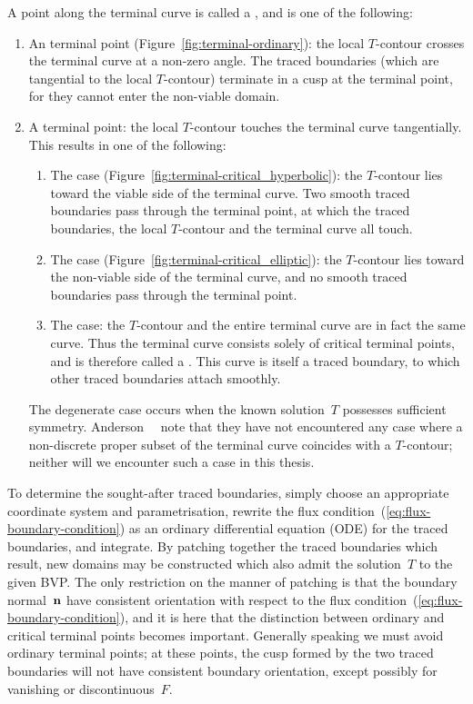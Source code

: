 A point along the terminal curve is called a ,
and is one of the following:
\begin{enumerate}
  \item
    An  terminal point
    (Figure~\ref{fig:terminal-ordinary}):
    the local $T$-contour crosses the terminal curve at a non-zero angle.
    The traced boundaries (which are tangential to the local $T$-contour)
    terminate in a cusp at the terminal point,
    for they cannot enter the non-viable domain.
  \item
    A  terminal point:
    the local $T$-contour touches the terminal curve tangentially.
    This results in one of the following:
    \begin{enumerate}
      \item
        The  case
        (Figure~\ref{fig:terminal-critical_hyperbolic}):
        the $T$-contour lies toward the viable side of the terminal curve.
        Two smooth traced boundaries pass through the terminal point,
        at which the traced boundaries,
        the local $T$-contour and the terminal curve
        all touch.
      \item
        The  case
        (Figure~\ref{fig:terminal-critical_elliptic}):
        the $T$-contour lies toward the non-viable side of the terminal curve,
        and no smooth traced boundaries pass through the terminal point.
      \item
        The  case:
        the $T$-contour and the entire terminal curve
        are in fact the same curve.
        Thus the terminal curve consists solely of critical terminal points,
        and is therefore called a .
        This curve is itself a traced boundary,
        to which other traced boundaries attach smoothly.
    \end{enumerate}
    The degenerate case occurs
    when the known solution~$T$ possesses sufficient symmetry.
    Anderson~\etal~\cite{anderson-2007-boundary-tracing-i-theory}
    note that they have not encountered any case
    where a non-discrete proper subset of the terminal curve
    coincides with a $T$-contour;
    neither will we encounter such a case in this thesis.
\end{enumerate}

To determine the sought-after traced boundaries,
simply choose an appropriate coordinate system and parametrisation,
rewrite the flux condition~(\ref{eq:flux-boundary-condition})
as an ordinary differential equation (ODE) for the traced boundaries,
and integrate.
By patching together the traced boundaries which result,
new domains may be constructed
which also admit the solution~$T$ to the given BVP\@.
The only restriction on the manner of patching
is that the boundary normal~$\mathop{}\!\boldsymbol{\mathbf{n}}$ have consistent orientation
with respect to the flux condition~(\ref{eq:flux-boundary-condition}),
and it is here that
the distinction between ordinary and critical terminal points
becomes important.
Generally speaking we must avoid ordinary terminal points;
at these points,
the cusp formed by the two traced boundaries
will not have consistent boundary orientation,
except possibly for vanishing or discontinuous~$F$.

